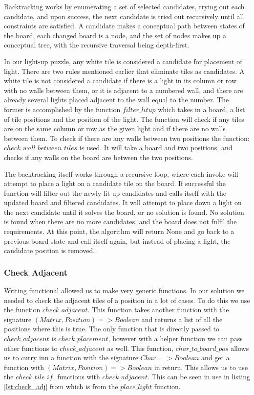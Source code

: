 \documentclass[12pt]{article}
\begin{document}
Backtracking works by enumerating a set of selected candidates, trying out each candidate, and upon success, the next candidate is tried out recursively until all constraints are satisfied. A candidate makes a conceptual path between states of the board, each changed board is a node, and the set of nodes makes up a conceptual tree, with the recursive traversal being depth-first.


In our light-up puzzle, any white tile is considered a candidate for placement of light. There are two rules mentioned earlier that eliminate tiles as candidates. A white tile is not considered a candidate if there is a light in its column or row with no walls between them, or it is adjacent to a numbered wall, and there are already several lights placed adjacent to the wall equal to the number. The former is accomplished by the function $filter\_litup$ which takes in a board, a list of tile positions and the position of the light. The function will check if any tiles are on the same column or row as the given light and if there are no walls between them. To check if there are any walls between two positions the function: $check\_wall\_between\_tiles$ is used. It will take a board and two positions, and checks if any walls on the board are between the two positions.


The backtracking itself works through a recursive loop, where each invoke will attempt to place a light on a candidate tile on the board. If successful the function will filter out the newly lit up candidates and calls itself with the updated board and filtered candidates. It will attempt to place down a light on the next candidate until it solves the board, or no solution is found. No solution is found when there are no more candidates, and the board does not fulfil the requirements. At this point, the algorithm will return None and go back to a previous board state and call itself again, but instead of placing a light, the candidate position is removed. 

\subsubsection{Check Adjacent}
\label{check_adjacent}
Writing functional allowed us to make very generic functions. In our solution we needed to check the adjacent tiles of a position in a lot of cases. To do this we use the function $check\_adjacent$. This function takes another function with the signature $(Matrix, Position) => Boolean$ and returns a list of all the positions where this is true. The only function that is directly passed to $check\_adjacent$ is $check\_placement$, however with a helper function we can pass other functions to $check\_adjacent$ as well. This function, $char\_to\_board\_pos$ allows us to curry inn a function with the signature $Char => Boolean$ and get a function with $(Matrix, Position) => Boolean$ in return. This allows us to use the $check\_tile\_if\_$ functions with $check\_adjacent$. This can be seen in use in listing \ref{lst:check_adj} from which is from the $place\_light$ function.
\end{document}
